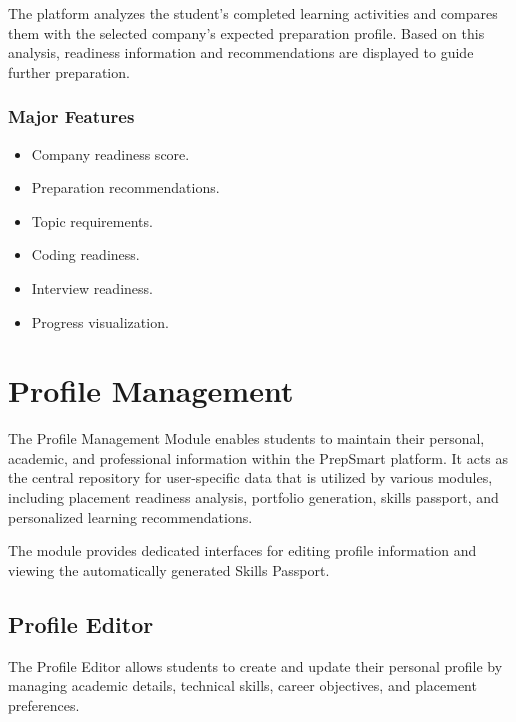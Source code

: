 The platform analyzes the student's completed learning activities and compares them with the selected company's expected preparation profile. Based on this analysis, readiness information and recommendations are displayed to guide further preparation.

\subsubsection*{Major Features}

\begin{itemize}

\item Company readiness score.

\item Preparation recommendations.

\item Topic requirements.

\item Coding readiness.

\item Interview readiness.

\item Progress visualization.

\end{itemize}

\section{Profile Management}

The Profile Management Module enables students to maintain their personal, academic, and professional information within the PrepSmart platform. It acts as the central repository for user-specific data that is utilized by various modules, including placement readiness analysis, portfolio generation, skills passport, and personalized learning recommendations.

The module provides dedicated interfaces for editing profile information and viewing the automatically generated Skills Passport.

\subsection{Profile Editor}

The Profile Editor allows students to create and update their personal profile by managing academic details, technical skills, career objectives, and placement preferences.

